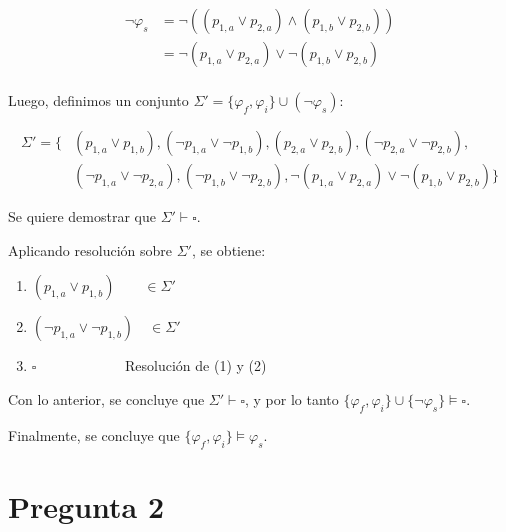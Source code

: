 \documentclass[12pt]{article}
\begin{document}
\begin{align*}
    \neg \varphi_s
    &= \neg ((p_{1,a} \lor p_{2,a}) \land (p_{1,b} \lor p_{2,b})) \\
    &= \neg (p_{1,a} \lor p_{2,a}) \lor \neg (p_{1,b} \lor p_{2,b}) \\
\end{align*}

Luego, definimos un conjunto $\Sigma' = \{\varphi_f, \varphi_i\} \cup (\neg \varphi_s)$:

\begin{align*}
    \Sigma' = 
    \{&(p_{1,a} \lor p_{1,b}), (\neg p_{1,a} \lor  \neg p_{1,b}), (p_{2,a} \lor p_{2,b}), (\neg p_{2,a} \lor \neg p_{2,b}), \\
    &(\neg p_{1,a} \lor \neg p_{2,a}),  (\neg p_{1,b} \lor \neg p_{2,b}), \neg (p_{1,a} \lor p_{2,a}) \lor \neg (p_{1,b} \lor p_{2,b})\}
\end{align*}

Se quiere demostrar que $\Sigma' \vdash \square$.

Aplicando resolución sobre $\Sigma'$, se obtiene:

\begin{enumerate}[label=(\arabic*)]
    \item $(p_{1,a} \lor p_{1,b}) \qquad\in \Sigma'$
    \item $(\neg p_{1,a} \lor  \neg p_{1,b}) \quad \in \Sigma'$
    \item $\square \qquad \qquad \qquad$ Resolución de (1) y (2)
\end{enumerate}

Con lo anterior, se concluye que $\Sigma' \vdash \square$, y por lo tanto $\{\varphi_f, \varphi_i\} \cup \{\neg \varphi_s\} \vDash \square$.

Finalmente, se concluye que $\{\varphi_f, \varphi_i\} \vDash \varphi_s$.





\newpage
\section*{Pregunta 2}
\end{document}
